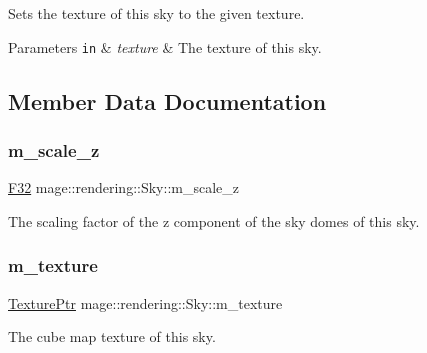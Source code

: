 Sets the texture of this sky to the given texture.


\begin{DoxyParams}[1]{Parameters}
\mbox{\tt in}  & {\em texture} & The texture of this sky. \\
\hline
\end{DoxyParams}


\subsection{Member Data Documentation}
\hypertarget{classmage_1_1rendering_1_1_sky_a45ba48d9ce09ff566f9edb930d759dba}{}\label{classmage_1_1rendering_1_1_sky_a45ba48d9ce09ff566f9edb930d759dba} 
\subsubsection{\texorpdfstring{m\+\_\+scale\+\_\+z}{m\_scale\_z}}
{\footnotesize\ttfamily \hyperlink{namespacemage_aa97e833b45f06d60a0a9c4fc22ae02c0}{F32} mage\+::rendering\+::\+Sky\+::m\+\_\+scale\+\_\+z\hspace{0.3cm}{\ttfamily [private]}}

The scaling factor of the z component of the sky domes of this sky. \hypertarget{classmage_1_1rendering_1_1_sky_a674493833d7c13a329ba35429a1d9dfa}{}\label{classmage_1_1rendering_1_1_sky_a674493833d7c13a329ba35429a1d9dfa} 
\subsubsection{\texorpdfstring{m\+\_\+texture}{m\_texture}}
{\footnotesize\ttfamily \hyperlink{namespacemage_1_1rendering_a6f3ae54f825328465b0cdde0f0de4a36}{Texture\+Ptr} mage\+::rendering\+::\+Sky\+::m\+\_\+texture\hspace{0.3cm}{\ttfamily [private]}}

The cube map texture of this sky. 